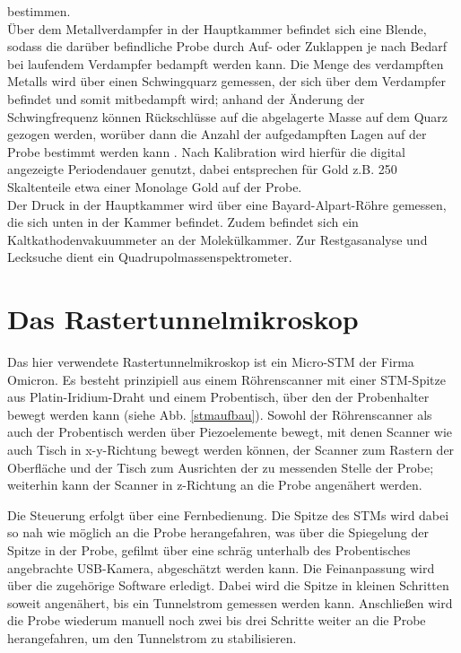 bestimmen.
\\
 Über dem Metallverdampfer in der Hauptkammer befindet sich eine
Blende, sodass die darüber befindliche Probe durch Auf- oder Zuklappen je nach Bedarf bei
laufendem Verdampfer bedampft werden kann. Die Menge des verdampften Metalls wird über einen
Schwingquarz gemessen, der sich über dem Verdampfer befindet und somit mitbedampft wird; anhand der
Änderung der Schwingfrequenz können Rückschlüsse auf die abgelagerte Masse auf dem Quarz gezogen
werden, worüber dann die Anzahl der aufgedampften Lagen auf der Probe bestimmt werden kann
\cite{Sau}.
Nach Kalibration wird hierfür die digital angezeigte Periodendauer genutzt, dabei entsprechen für
Gold z.B. 250 Skaltenteile etwa einer Monolage Gold auf der Probe.
\\
Der Druck in der Hauptkammer wird über eine Bayard-Alpart-Röhre gemessen, die sich unten in der
Kammer befindet. Zudem befindet sich ein Kaltkathodenvakuummeter %
an der Molekülkammer.
Zur Restgasanalyse und Lecksuche dient ein Quadrupolmassenspektrometer.%


\section{Das Rastertunnelmikroskop}

Das hier verwendete Rastertunnelmikroskop ist ein Micro-STM der Firma Omicron. Es besteht
prinzipiell aus einem Röhrenscanner mit einer STM-Spitze aus Platin-Iridium-Draht und einem
Probentisch, über den der Probenhalter bewegt werden kann (siehe Abb. \ref{stmaufbau}). Sowohl der
Röhren\-scanner als auch der Probentisch werden über Piezoelemente bewegt, mit denen Scanner
wie auch Tisch in x-y-Richtung bewegt werden können, der Scanner zum Rastern der Oberfläche und der
Tisch zum Ausrichten der zu messenden Stelle der Probe; weiterhin kann der Scanner in z-Richtung an
die Probe angenähert werden.

Die Steuerung erfolgt über eine Fernbedienung. Die Spitze des STMs wird dabei so nah wie möglich an
die Probe herangefahren, was über die Spiegelung der Spitze in der Probe, gefilmt über eine schräg
unterhalb des Probentisches angebrachte USB-Kamera, abgeschätzt werden kann. Die Feinanpassung wird
über die zugehörige Software erledigt.
Dabei wird die Spitze in kleinen Schritten soweit angenähert, bis ein Tunnelstrom gemessen werden
kann. Anschließen wird die Probe wiederum manuell noch zwei bis drei Schritte weiter an die Probe
herangefahren, um den Tunnelstrom zu stabilisieren.
\\

